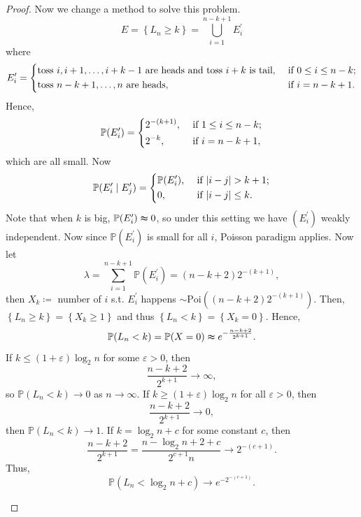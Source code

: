 \begin{proof}
    Now we change a method to solve this problem. 
    \[
        E = \left\{ L_n \ge k \right\} = \bigcup_{i=1}^{n-k+1} E_i^{\prime}  
    \] 
    where 
    \[
        E_i^{\prime}  = \begin{dcases}
            \text{toss } i, i + 1, \dots , i + k - 1 \text{ are heads and toss } i + k \text{ is tail} , &\text{ if }  0 \le i \le n - k;\\
            \text{toss } n - k + 1, \dots , n \text{ are heads}  , &\text{ if }  i = n - k + 1.
        \end{dcases}
    \]
    Hence,
    \[
        \mathbb{P} (E_i^{\prime} ) = \begin{dcases}
            2^{-(k + 1)}, &\text{ if } 1 \le i \le n - k  ;\\
            2^{-k}, &\text{ if } i = n - k + 1,
        \end{dcases}
    \]
    which are all small.
    Now 
    \[
        \mathbb{P} (E_i^{\prime}  \mid E_j^{\prime} ) = \begin{dcases}
            \mathbb{P} (E_i^{\prime} ), &\text{ if } \vert i - j \vert > k + 1 ;\\
            0, &\text{ if } \vert i - j \vert \le k.
        \end{dcases}
    \]
    Note that when \(k\) is big, \(\mathbb{P} (E_i^{\prime} ) \thickapprox 0\), so under this setting we have \((E_i^{\prime} )\) weakly independent. Now since \(\mathbb{P} (E_i^{\prime} )\) is small for all \(i\), Poisson paradigm applies. Now let 
    \[
        \lambda = \sum_{i=1}^{n-k+1} \mathbb{P} (E_i^{\prime} ) = (n - k + 2) 2^{-(k + 1)}, 
    \]    
    then \(X_k \coloneqq \) number of \(i\) s.t. \(E_i^{\prime} \) happens \(\sim \mathrm{Poi}((n - k + 2) 2^{-(k+1)}) \). Then, \(\left\{ L_n \ge k \right\} = \left\{ X_k \ge 1 \right\}  \) and thus \(\left\{ L_n < k \right\} = \left\{ X_k = 0 \right\}  \). Hence,
    \[
        \mathbb{P} (L_n < k) = \mathbb{P} (X = 0) \thickapprox e^{- \frac{n - k + 2}{2^{k+1}}}.
    \]   
    If \(k \le (1 + \varepsilon) \log_2 n\) for some \(\varepsilon > 0\), then 
    \[
        \frac{n - k + 2}{2^{k+1}} \to \infty,
    \]  
    so \(\mathbb{P} (L_n < k) \to 0\) as \(n \to \infty\). If \(k \ge (1 + \varepsilon) \log _2 n\) for all \(\varepsilon > 0\), then 
    \[
        \frac{n - k + 2}{2^{k + 1}} \to 0,
    \]  
    then \(\mathbb{P} (L_n < k) \to 1\). If \(k = \log _2 n + c\) for some constant \(c\), then 
    \[
        \frac{n - k + 2}{2^{k + 1}} = \frac{n - \log _2 n + 2 + c}{2^{c + 1} n} \to 2^{-(c+1)}. 
    \]   
    Thus,
    \[
        \mathbb{P} (L_n < \log _2 n + c) \to e^{-2^{-(c+1)}}.
    \]
    \begin{figure}[H]
    \centering
\end{figure}
\end{proof}
